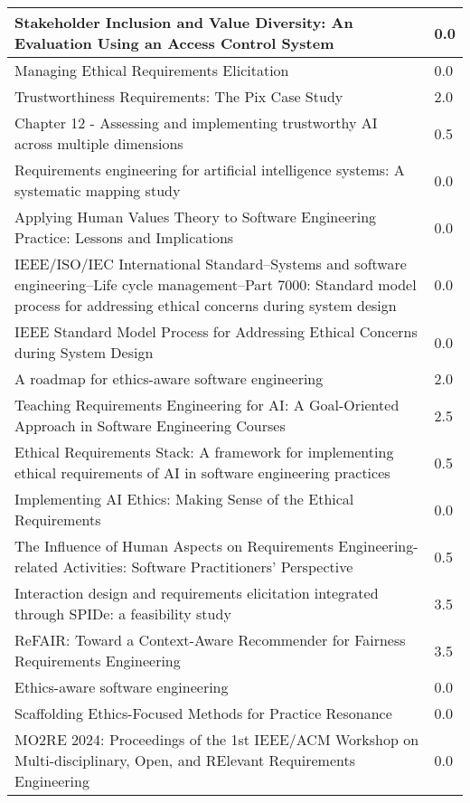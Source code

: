 \begin{longtable}{| m{10cm} | m{2cm} |}
    Stakeholder Inclusion and Value Diversity: An Evaluation Using an Access Control System & 0.0 \\
    \hline
    Managing Ethical Requirements Elicitation & 0.0 \\
    \hline
    Trustworthiness Requirements: The Pix Case Study & 2.0 \\
    \hline
    Chapter 12 - Assessing and implementing trustworthy AI across multiple dimensions & 0.5 \\
    \hline
    Requirements engineering for artificial intelligence systems: A systematic mapping study & 0.0 \\
    \hline
    Applying Human Values Theory to Software Engineering Practice: Lessons and Implications & 0.0 \\
    \hline
    IEEE/ISO/IEC International Standard--Systems and software engineering--Life cycle management--Part 7000: Standard model process for addressing ethical concerns during system design & 0.0 \\
    \hline
    IEEE Standard Model Process for Addressing Ethical Concerns during System Design & 0.0 \\
    \hline
    A roadmap for ethics-aware software engineering & 2.0 \\
    \hline
    Teaching Requirements Engineering for AI: A Goal-Oriented Approach in Software Engineering Courses & 2.5 \\
    \hline
    Ethical Requirements Stack: A framework for implementing ethical requirements of AI in software engineering practices & 0.5 \\
    \hline
    Implementing AI Ethics: Making Sense of the Ethical Requirements & 0.0 \\
    \hline
    The Influence of Human Aspects on Requirements Engineering-related Activities: Software Practitioners’ Perspective & 0.5 \\
    \hline
    Interaction design and requirements elicitation integrated through SPIDe: a feasibility study & 3.5 \\
    \hline
    ReFAIR: Toward a Context-Aware Recommender for Fairness Requirements Engineering & 3.5 \\
    \hline
    Ethics-aware software engineering & 0.0 \\
    \hline
    Scaffolding Ethics-Focused Methods for Practice Resonance & 0.0 \\
    \hline
    MO2RE 2024: Proceedings of the 1st IEEE/ACM Workshop on Multi-disciplinary, Open, and RElevant Requirements Engineering & 0.0 \\

\end{longtable}
